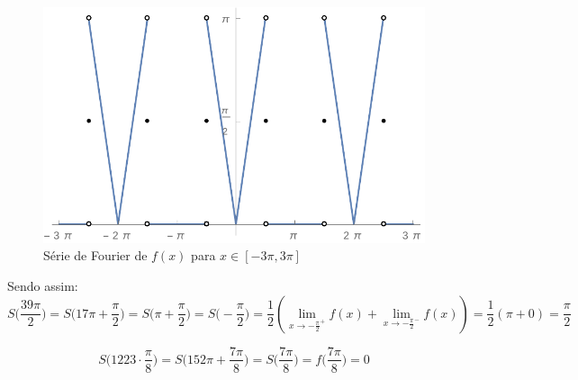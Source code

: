 \documentclass[12pt,a4paper]{article}
\begin{document}
\begin{itemize}
\begin{figure}[H]
	\centering
	\includegraphics[scale=0.7]{Fourier.pdf}  
	\caption{Série de Fourier de $f(x)$ para $x \in [-3\pi, 3\pi]$}
	\label{fig:figura2}
\end{figure}

Sendo assim:
$$ S\Big(\frac{39 \pi}{2}\Big) = S\Big(17\pi + \frac{\pi}{2}\Big) = S\Big(\pi + \frac{\pi}{2}\Big) = S\Big(- \frac{\pi}{2}\Big) = \frac{1}{2} ( \lim_{x \rightarrow - \frac{\pi}{2}^+ } f(x) + \lim_{x \rightarrow - \frac{\pi}{2}^- } f(x) ) = \frac{1}{2} ( \pi + 0) = \frac{\pi}{2} $$

$$ S\Big(1223 \cdot \frac{\pi}{8}\Big) = S\Big(152\pi + \frac{7 \pi}{8}\Big) = S\Big(\frac{7\pi}{8}\Big) = f\Big(\frac{7\pi}{8}\Big) = 0 $$

\end{itemize}
\end{document}
